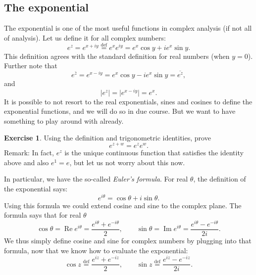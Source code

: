 \documentclass[12pt,openany]{book}
\renewcommand{\Re}{\operatorname{Re}}
\renewcommand{\Im}{\operatorname{Im}}
\newcommand{\sabs}[1]{\lvert {#1} \rvert}
\newcommand{\myindex}[1]{#1\index{#1}}
\theoremstyle{plain}
\theoremstyle{remark}
\theoremstyle{definition}
\newenvironment{exbox}{%
    \def\FrameCommand{\vrule width 1pt \relax\hspace {10pt}}%
    \MakeFramed {\advance \hsize -\width \FrameRestore }%
}{%
    \endMakeFramed
}
\theoremstyle{exercise}
\newtheorem{exercise}{Exercise}[section]
\theoremstyle{example}
\begin{document}
\subsection{The exponential}

The exponential is one of the most useful functions in complex analysis
(if not all of analysis).  Let us define it for all complex numbers:
\begin{equation*}
e^{z} = 
e^{x+iy}
\overset{\text{def}}{=}
e^x e^{iy}
=
e^x\cos y + i e^x \sin y .
\end{equation*}
This definition agrees with the standard definition for real numbers (when
$y=0$).  Further note that
\begin{equation*}
e^{\bar{z}} = 
e^{x-iy} =
e^x\cos y - i e^x \sin y  = \overline{e^{z}} ,
\end{equation*}
and
\begin{equation*}
\sabs{e^{z}} = 
\sabs{e^{x-iy}} =
e^x .
\end{equation*}
It is possible to not resort to the real exponentials, sines and cosines
to define the exponential functions, and we will do so in due course.
But we want to have something to play around with already.

\begin{exbox}
\begin{exercise}
Using the definition and trigonometric identities, prove
\begin{equation*}
e^{z+w} = e^z e^w .
\end{equation*}
Remark: In fact, $e^z$ is the unique continuous
function that satisfies the identity above
and also $e^1 = e$, but let us not worry about this now.
\end{exercise}
\end{exbox}

In particular, we have the so-called
\emph{\myindex{Euler's formula}}.  For real $\theta$, the definition
of the exponential says:
\begin{equation*}
e^{i\theta}
=
\cos \theta + i \sin \theta .
\end{equation*}
Using this formula we could extend cosine and sine to the complex plane.
The formula says that for real $\theta$
\begin{equation*}
\cos \theta = \Re e^{i\theta} = \frac{e^{i\theta}+e^{-i\theta}}{2} ,
\qquad
\sin \theta = \Im e^{i\theta} = \frac{e^{i\theta}-e^{-i\theta}}{2i} .
\end{equation*}
We thus simply define cosine and sine for complex numbers by plugging
into that formula, now that we know how to evaluate the exponential:
\begin{equation*}
\cos z \overset{\text{def}}{=} \frac{e^{iz}+e^{-iz}}{2} ,
\qquad
\sin z \overset{\text{def}}{=} \frac{e^{iz}-e^{-iz}}{2i} .
\end{equation*}
\end{document}
